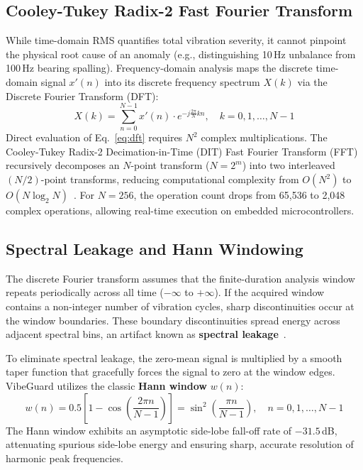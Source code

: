 \subsection{Cooley-Tukey Radix-2 Fast Fourier Transform}
While time-domain RMS quantifies total vibration severity, it cannot pinpoint the physical root cause of an anomaly (e.g., distinguishing 10\,Hz unbalance from 100\,Hz bearing spalling). Frequency-domain analysis maps the discrete time-domain signal $x'(n)$ into its discrete frequency spectrum $X(k)$ via the Discrete Fourier Transform (DFT):
\begin{equation}
X(k) = \sum_{n=0}^{N-1} x'(n) \cdot e^{-j \frac{2\pi}{N} k n}, \quad k = 0, 1, \dots, N-1
\label{eq:dft}
\end{equation}
Direct evaluation of Eq.~\ref{eq:dft} requires $N^2$ complex multiplications. The Cooley-Tukey Radix-2 Decimation-in-Time (DIT) Fast Fourier Transform (FFT) recursively decomposes an $N$-point transform ($N = 2^m$) into two interleaved $(N/2)$-point transforms, reducing computational complexity from $O(N^2)$ to $O(N \log_2 N)$~\cite{cooley1965algorithm}. For $N = 256$, the operation count drops from 65,536 to 2,048 complex operations, allowing real-time execution on embedded microcontrollers.

\subsection{Spectral Leakage and Hann Windowing}
The discrete Fourier transform assumes that the finite-duration analysis window repeats periodically across all time ($-\infty$ to $+\infty$). If the acquired window contains a non-integer number of vibration cycles, sharp discontinuities occur at the window boundaries. These boundary discontinuities spread energy across adjacent spectral bins, an artifact known as \textbf{spectral leakage}~\cite{harris1978use}.

To eliminate spectral leakage, the zero-mean signal is multiplied by a smooth taper function that gracefully forces the signal to zero at the window edges. VibeGuard utilizes the classic \textbf{Hann window} $w(n)$:
\begin{equation}
w(n) = 0.5 \left[ 1 - \cos\left(\frac{2\pi n}{N - 1}\right) \right] = \sin^2\left(\frac{\pi n}{N - 1}\right), \quad n = 0, 1, \dots, N-1
\label{eq:hann}
\end{equation}
The Hann window exhibits an asymptotic side-lobe fall-off rate of $-31.5$\,dB, attenuating spurious side-lobe energy and ensuring sharp, accurate resolution of harmonic peak frequencies.

